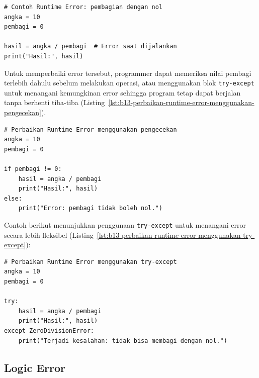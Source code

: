 \begin{lstlisting}[style=PythonStyle, caption={Contoh Runtime Error: pembagian dengan nol}, label={lst:b13-runtime-error-pembagian-dengan-nol}]
# Contoh Runtime Error: pembagian dengan nol
angka = 10
pembagi = 0

hasil = angka / pembagi  # Error saat dijalankan
print("Hasil:", hasil)
\end{lstlisting}

Untuk memperbaiki error tersebut, programmer dapat memeriksa nilai pembagi terlebih dahulu sebelum melakukan operasi, atau menggunakan blok \texttt{try-except} untuk menangani kemungkinan error sehingga program tetap dapat berjalan tanpa berhenti tiba-tiba (Listing~\ref{lst:b13-perbaikan-runtime-error-menggunakan-pengecekan}).

\begin{lstlisting}[style=PythonStyle, caption={Perbaikan Runtime Error menggunakan pengecekan}, label={lst:b13-perbaikan-runtime-error-menggunakan-pengecekan}]
# Perbaikan Runtime Error menggunakan pengecekan
angka = 10
pembagi = 0

if pembagi != 0:
    hasil = angka / pembagi
    print("Hasil:", hasil)
else:
    print("Error: pembagi tidak boleh nol.")
\end{lstlisting}

Contoh berikut menunjukkan penggunaan \texttt{try-except} untuk menangani error secara lebih fleksibel (Listing~\ref{lst:b13-perbaikan-runtime-error-menggunakan-try-except}):

\begin{lstlisting}[style=PythonStyle, caption={Perbaikan Runtime Error menggunakan try-except}, label={lst:b13-perbaikan-runtime-error-menggunakan-try-except}]
# Perbaikan Runtime Error menggunakan try-except
angka = 10
pembagi = 0

try:
    hasil = angka / pembagi
    print("Hasil:", hasil)
except ZeroDivisionError:
    print("Terjadi kesalahan: tidak bisa membagi dengan nol.")
\end{lstlisting}

\subsection{Logic Error}

